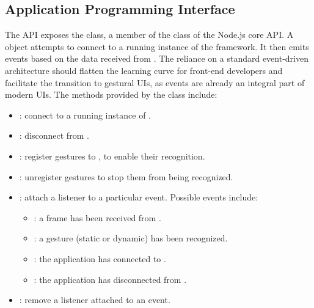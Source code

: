 \subsection{Application Programming Interface} \label{sec:quantumleap:description:api}

The \ql API exposes the  class, a member of the  class of the Node.js core API. A  object attempts to connect to a running instance of the \ql framework. It then emits events based on the data received from \ql. %
The reliance on a standard event-driven architecture should flatten the learning curve for front-end developers and facilitate the transition to gestural UIs, as events are already an integral part of modern UIs. The methods provided by the  class include:
\begin{itemize}[noitemsep]
    \item {}: connect to a running instance of \ql.
    \item {}: disconnect from \ql.
    \item {}: register gestures to \ql, to enable their recognition.
    \item {}: unregister gestures to stop them from being recognized.
    \item {}: attach a listener to a particular event. Possible events include:
    \begin{itemize}[noitemsep]
        \item {}: a frame has been received from \ql.
        \item {}: a gesture (static or dynamic) has been recognized.
        \item {}: the application has connected to \ql.
        \item {}: the application has disconnected from \ql.
    \end{itemize}
    \item {}: remove a listener attached to an event.
\end{itemize}

